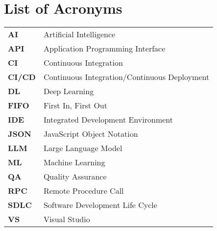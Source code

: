 \chapter*{List of Acronyms}

\begin{spacing}{1.8}

\begin{table}[H]
\centering
\renewcommand{\arraystretch}{1.4}%
\begin{tabular}{p{3cm}p{12cm}}
\textbf{AI} & Artificial Intelligence \\
\textbf{API} & Application Programming Interface \\
\textbf{CI} & Continuous Integration \\
\textbf{CI/CD} & Continuous Integration/Continuous Deployment \\
\textbf{DL} & Deep Learning \\
\textbf{FIFO} & First In, First Out \\
\textbf{IDE} & Integrated Development Environment \\
\textbf{JSON} & JavaScript Object Notation \\
\textbf{LLM} & Large Language Model \\
\textbf{ML} & Machine Learning \\
\textbf{QA} & Quality Assurance \\
\textbf{RPC} & Remote Procedure Call \\
\textbf{SDLC} & Software Development Life Cycle \\
\textbf{VS} & Visual Studio \\
\end{tabular}
\end{table}

\end{spacing}
